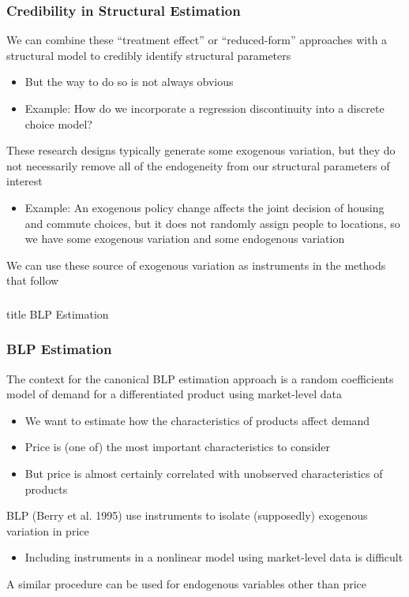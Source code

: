 \documentclass{beamer}
\begin{document}
\begin{frame}\frametitle{Credibility in Structural Estimation}
    We can combine these ``treatment effect'' or ``reduced-form'' approaches with a structural model to credibly identify structural parameters
    \begin{itemize}
    	\item But the way to do so is not always obvious
    	\item Example: How do we incorporate a regression discontinuity into a discrete choice model?
    \end{itemize}
    \vspace{2ex}
    These research designs typically generate some exogenous variation, but they do not necessarily remove all of the endogeneity from our structural parameters of interest
    \begin{itemize}
    	\item Example: An exogenous policy change affects the joint decision of housing and commute choices, but it does not randomly assign people to locations, so we have some exogenous variation and some endogenous variation
    \end{itemize}
    \vspace{2ex}
    We can use these source of exogenous variation as instruments in the methods that follow
\end{frame}

\begin{frame}\frametitle{}
    \vfill
    \centering
    \begin{beamercolorbox}[center]{title}
        \Large BLP Estimation
    \end{beamercolorbox}
    \vfill
\end{frame}

\begin{frame}\frametitle{BLP Estimation}
    The context for the canonical BLP estimation approach is a random coefficients model of demand for a differentiated product using market-level data
    \begin{itemize}
        \item We want to estimate how the characteristics of products affect demand
        \item Price is (one of) the most important characteristics to consider
        \item But price is almost certainly correlated with unobserved characteristics of products
    \end{itemize}
    \vspace{2ex}
    BLP (Berry et al. 1995) use instruments to isolate (supposedly) exogenous variation in price
    \begin{itemize}
        \item Including instruments in a nonlinear model using market-level data is difficult
    \end{itemize}
    \vspace{2ex}
    A similar procedure can be used for endogenous variables other than price
\end{frame}
\end{document}
